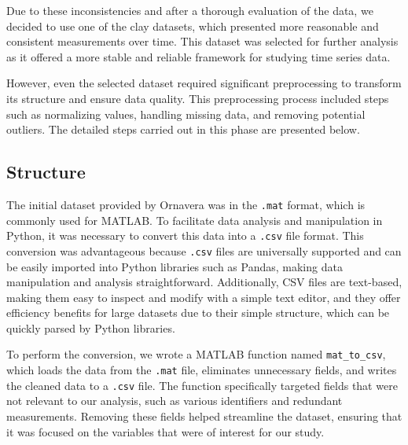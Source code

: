 Due to these inconsistencies and after a thorough evaluation of the data, we decided to use one of the clay datasets, which presented more reasonable and consistent measurements over time. This dataset was selected for further analysis as it offered a more stable and reliable framework for studying time series data.

However, even the selected dataset required significant preprocessing to transform its structure and ensure data quality. This preprocessing process included steps such as normalizing values, handling missing data, and removing potential outliers. The detailed steps carried out in this phase are presented below.

\subsection{Structure}

The initial dataset provided by Ornavera was in the \texttt{.mat} format, which is commonly used for MATLAB. To facilitate data analysis and manipulation in Python, it was necessary to convert this data into a \texttt{.csv} file format. This conversion was advantageous because \texttt{.csv} files are universally supported and can be easily imported into Python libraries such as Pandas, making data manipulation and analysis straightforward. Additionally, CSV files are text-based, making them easy to inspect and modify with a simple text editor, and they offer efficiency benefits for large datasets due to their simple structure, which can be quickly parsed by Python libraries.

To perform the conversion, we wrote a MATLAB function named \texttt{mat\_to\_csv}, which loads the data from the \texttt{.mat} file, eliminates unnecessary fields, and writes the cleaned data to a \texttt{.csv} file. The function specifically targeted fields that were not relevant to our analysis, such as various identifiers and redundant measurements. Removing these fields helped streamline the dataset, ensuring that it was focused on the variables that were of interest for our study.

